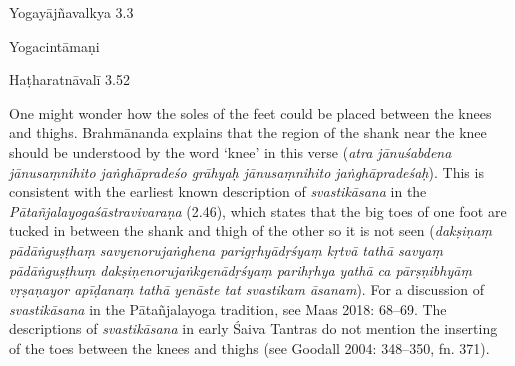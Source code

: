 \begin{ekdosis}
\begin{sources}[hp01_019]
Yogayājñavalkya 3.3

\begin{versinnote}
\end{versinnote}

\end{sources}

\begin{testimonia}[hp01_019]
Yogacintāmaṇi

\begin{versinnote}
\end{versinnote}

Haṭharatnāvalī 3.52

\begin{versinnote}
\end{versinnote}

\end{testimonia}

\begin{philcomm}[hp01_019]        
One might wonder how the soles of the feet could be placed between the knees and thighs. Brahmānanda explains that the region of the shank near the knee should be understood by the word ‘knee’ in this verse (\emph{atra jānuśabdena jānusaṃnihito jaṅghāpradeśo grāhyaḥ jānusaṃnihito jaṅghāpradeśaḥ}). This is consistent with the earliest known description of \emph{svastikāsana} in the \emph{Pātañjalayogaśāstravivaraṇa} (2.46), which states that the big toes of one foot are tucked in between the shank and thigh of the other so it is not seen (\emph{dakṣiṇaṃ pādāṅguṣṭhaṃ savyenorujaṅghena parigṛhyādṛśyaṃ kṛtvā tathā savyaṃ pādāṅguṣṭhuṃ dakṣiṇenorujaṅkgenādṛśyaṃ parihṛhya yathā ca pārṣṇibhyāṃ vṛṣaṇayor apīḍanaṃ tathā yenāste tat svastikam āsanam}). For a discussion of \emph{svastikāsana} in the Pātañjalayoga tradition, see Maas 2018: 68–69. The descriptions of \emph{svastikāsana} in early Śaiva Tantras do not mention the inserting of the toes between the knees and thighs (see Goodall 2004: 348–350, fn. 371).
\end{philcomm}


\end{ekdosis}
